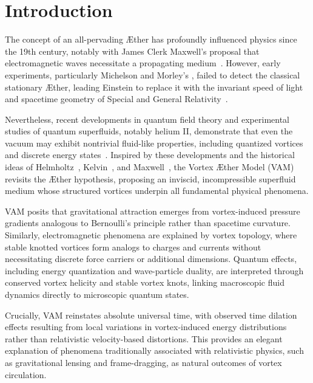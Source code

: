 



\section*{Introduction}

The concept of an all-pervading Æther has profoundly influenced physics since the 19th century, notably with James Clerk Maxwell's proposal that electromagnetic waves necessitate a propagating medium~\cite{Maxwell1865}. However, early experiments, particularly Michelson and Morley's \cite{michelson1887}, failed to detect the classical stationary Æther, leading Einstein to replace it with the invariant speed of light and spacetime geometry of Special and General Relativity~\cite{einstein1916foundation}.

Nevertheless, recent developments in quantum field theory and experimental studies of quantum superfluids, notably helium II, demonstrate that even the vacuum may exhibit nontrivial fluid-like properties, including quantized vortices and discrete energy states~\cite{Wilczek1999, Donnelly1991quantized}. Inspired by these developments and the historical ideas of Helmholtz~\cite{helmholtz1867integrals}, Kelvin~\cite{kelvin1867vortex}, and Maxwell~\cite{Maxwell1865}, the Vortex Æther Model (VAM) revisits the Æther hypothesis, proposing an inviscid, incompressible superfluid medium whose structured vortices underpin all fundamental physical phenomena.

VAM posits that gravitational attraction emerges from vortex-induced pressure gradients analogous to Bernoulli's principle rather than spacetime curvature. Similarly, electromagnetic phenomena are explained by vortex topology, where stable knotted vortices form analogs to charges and currents without necessitating discrete force carriers or additional dimensions. Quantum effects, including energy quantization and wave-particle duality, are interpreted through conserved vortex helicity and stable vortex knots, linking macroscopic fluid dynamics directly to microscopic quantum states.

Crucially, VAM reinstates absolute universal time, with observed time dilation effects resulting from local variations in vortex-induced energy distributions rather than relativistic velocity-based distortions. This provides an elegant explanation of phenomena traditionally associated with relativistic physics, such as gravitational lensing and frame-dragging, as natural outcomes of vortex circulation.

